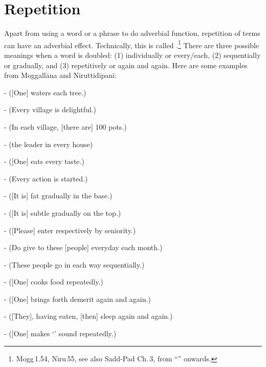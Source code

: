{}
\section*{Repetition}\label{sec:repetition}

Apart from using a word or a phrase to do adverbial function, repetition of terms can have an adverbial effect. Technically, this is called .\footnote{Mogg\,1.54, Niru\,55, see also Sadd-Pad Ch.\,3, from ``'' onwards.} There are three possible meanings when a word is doubled: (1) individually or every/each, (2) sequentially or gradually, and (3) repetitively or again and again. Here are some examples from Moggall\=ana and Niruttid\=ipan\=i:\par
-  ([One] waters each tree.)\par
-  (Every village is delightful.)\par
-  (In each village, [there are] 100 pots.)\par
-  (the leader in every house)\par
-  ([One] eats every taste.)\par
-  (Every action is started.)\par
-  ([It is] fat gradually in the base.)\par
-  ([It is] subtle gradually on the top.)\par
-  ([Please] enter respectively by seniority.)\par
-  (Do give to these [people] everyday each month.)\par
-  (These people go in each way sequentially.)\par
-  ([One] cooks food repeatedly.)\par
-  ([One] brings forth demerit again and again.)\par
-  ([They], having eaten, [then] sleep again and again.)\par 
-  ([One] makes `' sound repeatedly.)\par

